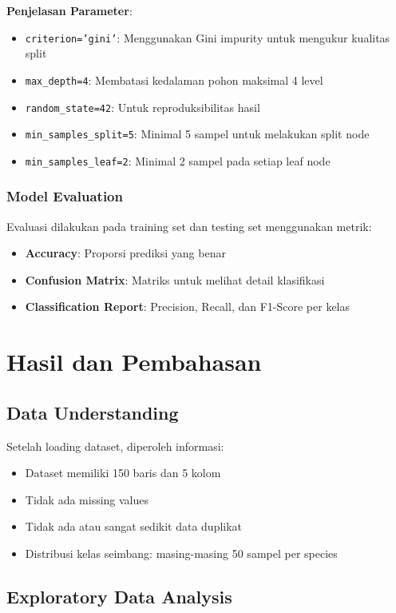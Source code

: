 \documentclass[11pt,a4paper]{article}
\begin{document}
\textbf{Penjelasan Parameter}:
\begin{itemize}
    \item \texttt{criterion='gini'}: Menggunakan Gini impurity untuk mengukur kualitas split
    \item \texttt{max\_depth=4}: Membatasi kedalaman pohon maksimal 4 level
    \item \texttt{random\_state=42}: Untuk reproduksibilitas hasil
    \item \texttt{min\_samples\_split=5}: Minimal 5 sampel untuk melakukan split node
    \item \texttt{min\_samples\_leaf=2}: Minimal 2 sampel pada setiap leaf node
\end{itemize}

\subsubsection{Model Evaluation}
Evaluasi dilakukan pada training set dan testing set menggunakan metrik:
\begin{itemize}
    \item \textbf{Accuracy}: Proporsi prediksi yang benar
    \item \textbf{Confusion Matrix}: Matriks untuk melihat detail klasifikasi
    \item \textbf{Classification Report}: Precision, Recall, dan F1-Score per kelas
\end{itemize}

\section{Hasil dan Pembahasan}

\subsection{Data Understanding}
Setelah loading dataset, diperoleh informasi:
\begin{itemize}
    \item Dataset memiliki 150 baris dan 5 kolom
    \item Tidak ada missing values
    \item Tidak ada atau sangat sedikit data duplikat
    \item Distribusi kelas seimbang: masing-masing 50 sampel per species
\end{itemize}

\subsection{Exploratory Data Analysis}
\end{document}
